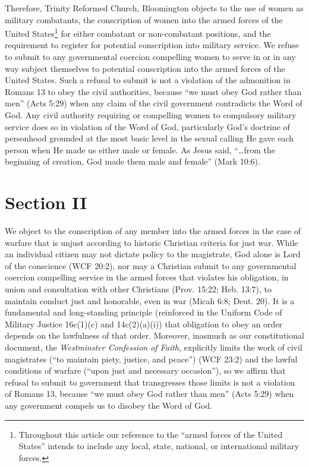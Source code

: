 \documentclass[
]{book}
\begin{document}
Therefore, Trinity Reformed Church, Bloomington objects to the use of women as military combatants, the conscription of women into the armed forces of the United States\footnote{Throughout this article our reference to the ``armed forces of the United States'' intends to include any local, state, national, or international military forces.} for either combatant or non-combatant positions, and the requirement to register for potential conscription into military service. We refuse to submit to any governmental coercion compelling women to serve in or in any way subject themselves to potential conscription into the armed forces of the United States. Such a refusal to submit is not a violation of the admonition in Romans 13 to obey the civil authorities, because ``we must obey God rather than men'' (Acts 5:29) when any claim of the civil government contradicts the Word of God. Any civil authority requiring or compelling women to compulsory military service does so in violation of the Word of God, particularly God's doctrine of personhood grounded at the most basic level in the sexual calling He gave each person when He made us either male or female. As Jesus said, ``\ldots from the beginning of creation, God made them male and female'' (Mark 10:6).

\hypertarget{section-ii}{%
\section{Section II}\label{section-ii}}

We object to the conscription of any member into the armed forces in the case of warfare that is unjust according to historic Christian criteria for just war. While an individual citizen may not dictate policy to the magistrate, God alone is Lord of the conscience (WCF 20:2), nor may a Christian submit to any governmental coercion compelling service in the armed forces that violates his obligation, in union and consultation with other Christians (Prov. 15:22; Heb. 13:7), to maintain conduct just and honorable, even in war (Micah 6:8; Deut. 20). It is a fundamental and long-standing principle (reinforced in the Uniform Code of Military Justice 16c(1)(c) and 14c(2)(a)(i)) that obligation to obey an order depends on the lawfulness of that order. Moreover, inasmuch as our constitutional document, the \emph{Westminster Confession of Faith}, explicitly limits the work of civil magistrates (``to maintain piety, justice, and peace'') (WCF 23:2) and the lawful conditions of warfare (``upon just and necessary occasion''), so we affirm that refusal to submit to government that transgresses those limits is not a violation of Romans 13, because ``we must obey God rather than men'' (Acts 5:29) when any government compels us to disobey the Word of God.
\end{document}
